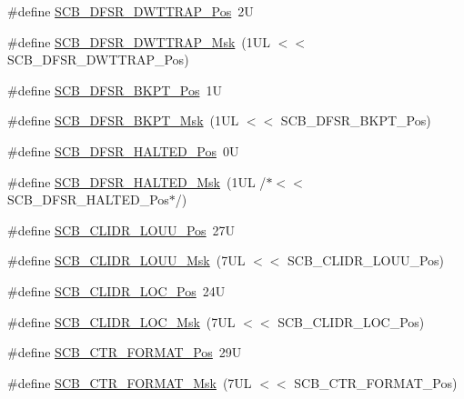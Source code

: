 \begin{DoxyCompactItemize}
\item 
\#define \hyperlink{group___c_m_s_i_s___s_c_b_gaccf82364c6d0ed7206f1084277b7cc61}{S\+C\+B\+\_\+\+D\+F\+S\+R\+\_\+\+D\+W\+T\+T\+R\+A\+P\+\_\+\+Pos}~2U
\item 
\#define \hyperlink{group___c_m_s_i_s___s_c_b_ga3f7384b8a761704655fd45396a305663}{S\+C\+B\+\_\+\+D\+F\+S\+R\+\_\+\+D\+W\+T\+T\+R\+A\+P\+\_\+\+Msk}~(1\+U\+L $<$$<$ S\+C\+B\+\_\+\+D\+F\+S\+R\+\_\+\+D\+W\+T\+T\+R\+A\+P\+\_\+\+Pos)
\item 
\#define \hyperlink{group___c_m_s_i_s___s_c_b_gaf28fdce48655f0dcefb383aebf26b050}{S\+C\+B\+\_\+\+D\+F\+S\+R\+\_\+\+B\+K\+P\+T\+\_\+\+Pos}~1U
\item 
\#define \hyperlink{group___c_m_s_i_s___s_c_b_ga609edf8f50bc49adb51ae28bcecefe1f}{S\+C\+B\+\_\+\+D\+F\+S\+R\+\_\+\+B\+K\+P\+T\+\_\+\+Msk}~(1\+U\+L $<$$<$ S\+C\+B\+\_\+\+D\+F\+S\+R\+\_\+\+B\+K\+P\+T\+\_\+\+Pos)
\item 
\#define \hyperlink{group___c_m_s_i_s___s_c_b_gaef4ec28427f9f88ac70a13ae4e541378}{S\+C\+B\+\_\+\+D\+F\+S\+R\+\_\+\+H\+A\+L\+T\+E\+D\+\_\+\+Pos}~0U
\item 
\#define \hyperlink{group___c_m_s_i_s___s_c_b_ga200bcf918d57443b5e29e8ce552e4bdf}{S\+C\+B\+\_\+\+D\+F\+S\+R\+\_\+\+H\+A\+L\+T\+E\+D\+\_\+\+Msk}~(1\+U\+L /$\ast$$<$$<$ S\+C\+B\+\_\+\+D\+F\+S\+R\+\_\+\+H\+A\+L\+T\+E\+D\+\_\+\+Pos$\ast$/)
\item 
\#define \hyperlink{group___c_m_s_i_s___s_c_b_ga384f04641b96d74495e023cca27ed72f}{S\+C\+B\+\_\+\+C\+L\+I\+D\+R\+\_\+\+L\+O\+U\+U\+\_\+\+Pos}~27U
\item 
\#define \hyperlink{group___c_m_s_i_s___s_c_b_ga4a2124def29e03f85d8ab6b455f5a174}{S\+C\+B\+\_\+\+C\+L\+I\+D\+R\+\_\+\+L\+O\+U\+U\+\_\+\+Msk}~(7\+U\+L $<$$<$ S\+C\+B\+\_\+\+C\+L\+I\+D\+R\+\_\+\+L\+O\+U\+U\+\_\+\+Pos)
\item 
\#define \hyperlink{group___c_m_s_i_s___s_c_b_gad723f01984bb639c77acc9529fa35ea8}{S\+C\+B\+\_\+\+C\+L\+I\+D\+R\+\_\+\+L\+O\+C\+\_\+\+Pos}~24U
\item 
\#define \hyperlink{group___c_m_s_i_s___s_c_b_ga3accaa1c94b1d7b920a48ffa1b47443b}{S\+C\+B\+\_\+\+C\+L\+I\+D\+R\+\_\+\+L\+O\+C\+\_\+\+Msk}~(7\+U\+L $<$$<$ S\+C\+B\+\_\+\+C\+L\+I\+D\+R\+\_\+\+L\+O\+C\+\_\+\+Pos)
\item 
\#define \hyperlink{group___c_m_s_i_s___s_c_b_gab3c7f12bf78e1049eeb477a1d48b144f}{S\+C\+B\+\_\+\+C\+T\+R\+\_\+\+F\+O\+R\+M\+A\+T\+\_\+\+Pos}~29U
\item 
\#define \hyperlink{group___c_m_s_i_s___s_c_b_gaf0303349e35d3777aa3aceae268f1651}{S\+C\+B\+\_\+\+C\+T\+R\+\_\+\+F\+O\+R\+M\+A\+T\+\_\+\+Msk}~(7\+U\+L $<$$<$ S\+C\+B\+\_\+\+C\+T\+R\+\_\+\+F\+O\+R\+M\+A\+T\+\_\+\+Pos)
$$
\end{DoxyCompactItemize}
